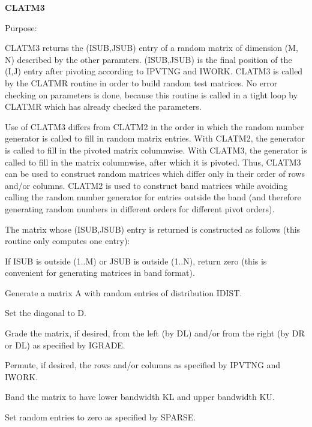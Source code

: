 {\bfseries C\+L\+A\+T\+M3} 

\begin{DoxyParagraph}{Purpose\+: }
\begin{DoxyVerb}    CLATM3 returns the (ISUB,JSUB) entry of a random matrix of
    dimension (M, N) described by the other paramters. (ISUB,JSUB)
    is the final position of the (I,J) entry after pivoting
    according to IPVTNG and IWORK. CLATM3 is called by the
    CLATMR routine in order to build random test matrices. No error
    checking on parameters is done, because this routine is called in
    a tight loop by CLATMR which has already checked the parameters.

    Use of CLATM3 differs from CLATM2 in the order in which the random
    number generator is called to fill in random matrix entries.
    With CLATM2, the generator is called to fill in the pivoted matrix
    columnwise. With CLATM3, the generator is called to fill in the
    matrix columnwise, after which it is pivoted. Thus, CLATM3 can
    be used to construct random matrices which differ only in their
    order of rows and/or columns. CLATM2 is used to construct band
    matrices while avoiding calling the random number generator for
    entries outside the band (and therefore generating random numbers
    in different orders for different pivot orders).

    The matrix whose (ISUB,JSUB) entry is returned is constructed as
    follows (this routine only computes one entry):

      If ISUB is outside (1..M) or JSUB is outside (1..N), return zero
         (this is convenient for generating matrices in band format).

      Generate a matrix A with random entries of distribution IDIST.

      Set the diagonal to D.

      Grade the matrix, if desired, from the left (by DL) and/or
         from the right (by DR or DL) as specified by IGRADE.

      Permute, if desired, the rows and/or columns as specified by
         IPVTNG and IWORK.

      Band the matrix to have lower bandwidth KL and upper
         bandwidth KU.

      Set random entries to zero as specified by SPARSE.\end{DoxyVerb}
 
\end{DoxyParagraph}

